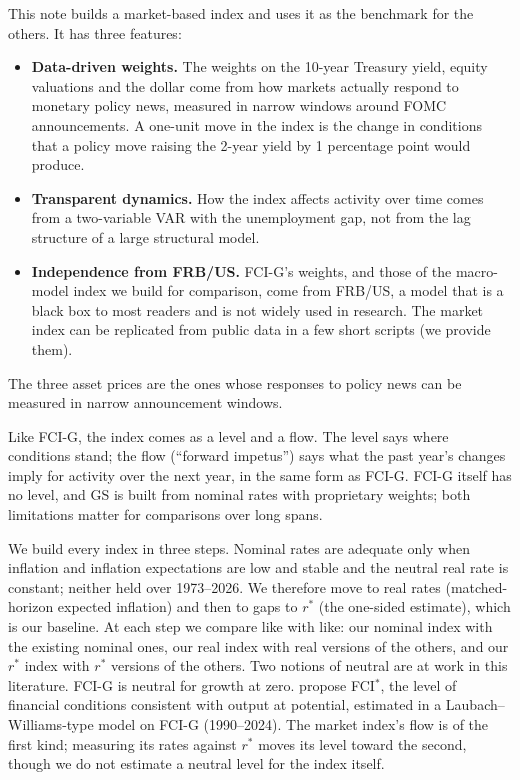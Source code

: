 \documentclass[11pt]{article}
\begin{document}
This note builds a market-based index and uses it as the benchmark for the others. It has three features:
\begin{itemize}
\item \textbf{Data-driven weights.} The weights on the 10-year Treasury yield, equity valuations and the dollar come from how markets actually respond to monetary policy news, measured in narrow windows around FOMC announcements. A one-unit move in the index is the change in conditions that a policy move raising the 2-year yield by 1 percentage point would produce.
\item \textbf{Transparent dynamics.} How the index affects activity over time comes from a two-variable VAR with the unemployment gap, not from the lag structure of a large structural model.
\item \textbf{Independence from FRB/US.} FCI-G's weights, and those of the macro-model index we build for comparison, come from FRB/US, a model that is a black box to most readers and is not widely used in research. The market index can be replicated from public data in a few short scripts (we provide them).
\end{itemize}
The three asset prices are the ones whose responses to policy news can be measured in narrow announcement windows.

Like FCI-G, the index comes as a level and a flow. The level says where conditions stand; the flow (``forward impetus'') says what the past year's changes imply for activity over the next year, in the same form as FCI-G. FCI-G itself has no level, and GS is built from nominal rates with proprietary weights; both limitations matter for comparisons over long spans.

We build every index in three steps. Nominal rates are adequate only when inflation and inflation expectations are low and stable and the neutral real rate is constant; neither held over 1973--2026. We therefore move to real rates (matched-horizon expected inflation) and then to gaps to $r^*$ (the one-sided \citealt{laubach2003} estimate), which is our baseline. At each step we compare like with like: our nominal index with the existing nominal ones, our real index with real versions of the others, and our $r^*$ index with $r^*$ versions of the others. Two notions of neutral are at work in this literature. FCI-G is neutral for growth at zero. \citet{caballero2026} propose FCI$^*$, the level of financial conditions consistent with output at potential, estimated in a Laubach--Williams-type model on FCI-G (1990--2024). The market index's flow is of the first kind; measuring its rates against $r^*$ moves its level toward the second, though we do not estimate a neutral level for the index itself.
\end{document}

